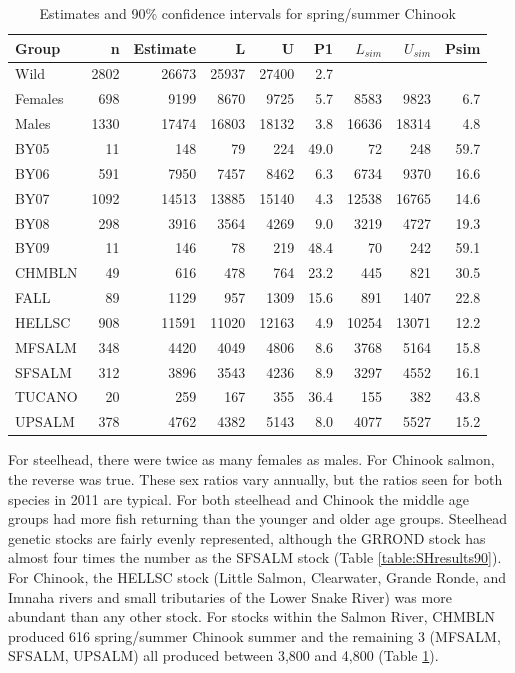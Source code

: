 \documentclass[12pt]{article}
\begin{document}
\begin{table}
\caption{Estimates and 90\% confidence intervals for spring/summer Chinook}
\label{table:CHresults90} 
\begin{center}
\begin{tabular}{|l|r|r|r|r|r|r|r|r|}
\hline Group & n & Estimate & L & U & P1 & $L_{sim}$ & $U_{sim}$ & Psim \\ 
\hline  Wild&2802&26673  &25937 &27400  &2.7 &  &  & \\ 
\hline  Females&698&9199  &8670  &9725  &5.7 &8583  &9823  &6.7 \\ 
\hline  Males&1330&17474  &16803  &18132  &3.8 &16636  &18314  &4.8 \\ 
\hline  BY05&11&148  &79  &224  &49.0 &72  &248  & 59.7\\ 
\hline  BY06&591&7950  &7457  &8462  &6.3 &6734  &9370  &16.6 \\ 
\hline  BY07&1092&14513  &13885  &15140  &4.3 &12538  &16765  &14.6 \\ 
\hline  BY08&298& 3916 &3564  &4269  &9.0 &3219  &4727  & 19.3 \\ 
\hline  BY09&11&146  &78  &219  &48.4 &70  &242  &59.1 \\ 
\hline  CHMBLN&49&616  &478  &764  &23.2 &445  &821  &30.5 \\ 
\hline  FALL&89&1129  &957  &1309  &15.6 &891  &1407  &22.8 \\ 
\hline  HELLSC&908&11591  &11020  &12163  &4.9 &10254  &13071  & 12.2\\ 
\hline  MFSALM&348&4420  &4049  &4806  &8.6 &3768  &5164  &15.8 \\ 
\hline  SFSALM&312&3896  &3543  &4236  &8.9 &3297  &4552  &16.1 \\ 
\hline  TUCANO&20&259  &167 &355  &36.4 &155  &382  &43.8 \\ 
\hline  UPSALM&378&4762  &4382  &5143  &8.0 &4077  &5527  &15.2 \\ 
\hline 
\end{tabular}
\end{center}
\end{table}

For steelhead, there were twice as many females as males. For Chinook salmon, the reverse was true. These sex ratios vary annually, but the ratios seen for both species in 2011 are typical. For both steelhead and Chinook the middle age groups had more fish returning than the younger and older age groups. Steelhead genetic stocks are fairly evenly represented, although the GRROND stock has almost four times the number as the SFSALM stock (Table \ref{table:SHresults90}). For Chinook, the HELLSC stock (Little Salmon, Clearwater, Grande Ronde, and Imnaha rivers and small tributaries of the Lower Snake River) was more abundant than any other stock. For stocks within the Salmon River, CHMBLN produced 616 spring/summer Chinook summer and the remaining 3 (MFSALM, SFSALM, UPSALM) all produced between 3,800 and 4,800 (Table \ref{table:CHresults90}). 
\end{document}
